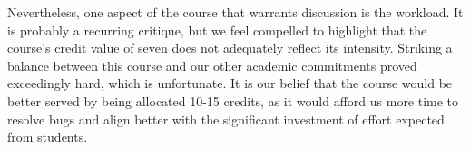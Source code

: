 \medskip

Nevertheless, one aspect of the course that warrants discussion is the workload. It is probably a recurring critique, but we feel compelled to highlight that the course's credit value of seven does not adequately reflect its intensity. Striking a balance between this course and our other academic commitments proved exceedingly hard, which is unfortunate. It is our belief that the course would be better served by being allocated 10-15 credits, as it would afford us more time to resolve bugs and align better with the significant investment of effort expected from students.

\endgroup